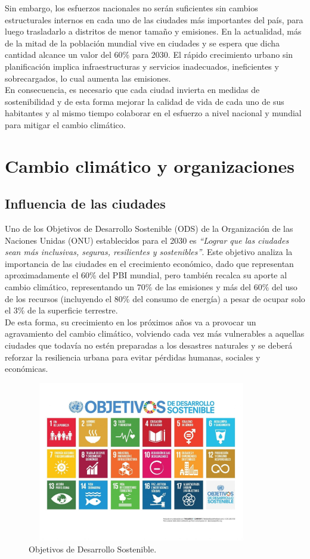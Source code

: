 \documentclass[runningheads]{llncs}
\begin{document}
Sin embargo, los esfuerzos nacionales no serán suficientes sin cambios estructurales internos en cada uno de las ciudades más importantes del país, para luego trasladarlo a distritos de menor tamaño y emisiones. En la actualidad, más de la mitad de la población mundial vive en ciudades y se espera que dicha cantidad alcance un valor del 60\% para 2030. El rápido crecimiento urbano sin planificación implica infraestructuras y servicios inadecuados, ineficientes y sobrecargados, lo cual aumenta las emisiones.\\

En consecuencia, es necesario que cada ciudad invierta en medidas de sostenibilidad y de esta forma mejorar la calidad de vida de cada uno de sus habitantes y al mismo tiempo colaborar en el esfuerzo a nivel nacional y mundial para mitigar el cambio climático.


\section{Cambio climático y organizaciones}
\subsection{Influencia de las ciudades}
Uno de los Objetivos de Desarrollo Sostenible (ODS) de la Organización de las Naciones Unidas (ONU) establecidos para el 2030 es \textit{“Lograr que las ciudades sean más inclusivas, seguras, resilientes y sostenibles”}. Este objetivo analiza la importancia de las ciudades en el crecimiento económico, dado que representan aproximadamente el 60\% del PBI mundial, pero también recalca su aporte al cambio climático, representando un 70\% de las emisiones y más del 60\% del uso de los recursos (incluyendo el 80\% del consumo de energía) a pesar de ocupar solo el 3\% de la superficie terrestre.\\

De esta forma, su crecimiento en los próximos años va a provocar un agravamiento del cambio climático, volviendo cada vez más vulnerables a aquellas ciudades que todavía no estén preparadas a los desastres naturales y se deberá reforzar la resiliencia urbana para evitar pérdidas humanas, sociales y económicas.~\cite{ref_url9}
\begin{figure}
\centering
\includegraphics[width=10cm, height=7cm]{CEPAL.jpg}
\caption{Objetivos de Desarrollo Sostenible.} \label{fig1}
\end{figure}
\end{document}
